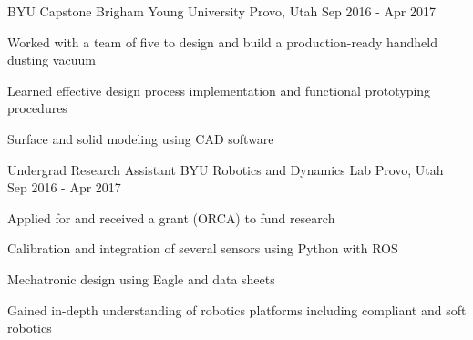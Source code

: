 \begin{cventries}


  \cventry
    {BYU Capstone} %
    {Brigham Young University} %
    {Provo, Utah} %
    {Sep 2016 - Apr 2017} %
    {
      \begin{cvitems} %
        \item {Worked with a team of five to design and build a production-ready handheld dusting vacuum}
        \item {Learned effective design process implementation and functional prototyping procedures}
        \item {Surface and solid modeling using CAD software}
      \end{cvitems}
    }

  \cventry
    {Undergrad Research Assistant} %
    {BYU Robotics and Dynamics Lab} %
    {Provo, Utah} %
    {Sep 2016 - Apr 2017} %
    {
      \begin{cvitems} %
        \item {Applied for and received a grant (ORCA) to fund research}
        \item {Calibration and integration of several sensors using Python with ROS}
        \item {Mechatronic design using Eagle and data sheets}
        \item {Gained in-depth understanding of robotics platforms including compliant and soft robotics}
      \end{cvitems}
    }



\end{cventries}
